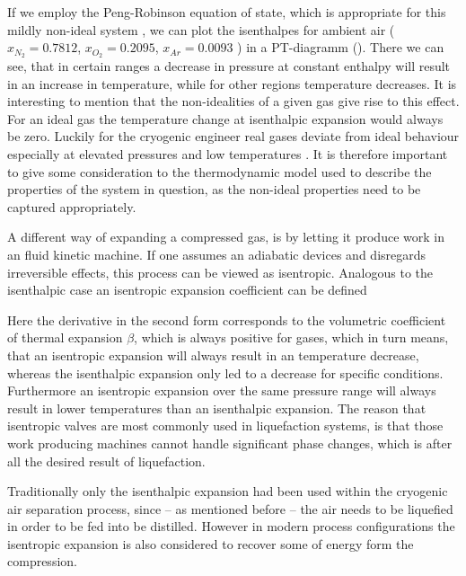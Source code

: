         If we employ the Peng-Robinson equation of state, which is appropriate for this mildly non-ideal system
        \cite{AndreasPfennig.2003}, we can plot the isenthalpes for ambient air ($x_{N_2}=0.7812$, $x_{O_2}=0.2095$,
        $x_{Ar}=0.0093$ ) in a PT-diagramm ().
        There we can see, that in certain ranges a decrease in pressure at constant enthalpy will result
        in an increase in temperature, while for other regions temperature decreases. It is interesting
        to mention that the non-idealities of a given gas give rise to this effect. For an ideal gas the
        temperature change at isenthalpic expansion would always be zero. Luckily for the cryogenic engineer
        real gases deviate from ideal behaviour especially at elevated pressures and low temperatures \cite{Barron.1985}.
        It is therefore important to give some consideration to the thermodynamic model used to describe the properties
        of the system in question, as the non-ideal properties need to be captured appropriately.

        A different way of expanding a compressed gas, is by letting it produce work in an fluid kinetic machine.
        If one assumes an adiabatic devices and disregards irreversible effects, this process can be viewed as
        isentropic. Analogous to the isenthalpic case an isentropic expansion coefficient can be defined

        Here the derivative in the second form corresponds to the volumetric coefficient of thermal expansion
        $\beta$, which is always positive for gases, which in turn means, that an isentropic expansion
        will always result in an temperature decrease, whereas the isenthalpic expansion only led to a decrease for
        specific conditions. Furthermore an isentropic expansion over the same pressure range will always result in
        lower temperatures than an isenthalpic expansion. The reason that isentropic valves are most commonly used
        in liquefaction systems, is that those work producing machines cannot handle significant phase changes,
        which is after all the desired result of liquefaction.

        Traditionally only the isenthalpic expansion had been used within the cryogenic air separation process,
        since -- as mentioned before -- the air needs to be liquefied in order to be fed into be distilled. However
        in modern process configurations the isentropic expansion is also considered to recover some of energy
        form the compression.

